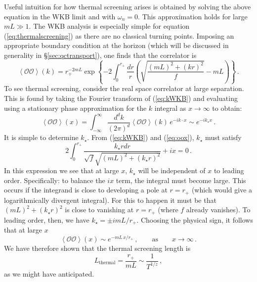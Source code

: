 \documentclass[10pt, oneside]{book}
\def\be{\begin{equation}}
\def\ee{\end{equation}}
\def\ocal{{\mathcal{O}}}
\begin{document}
\begin{doublespace}
Useful intuition for how thermal screening arises is obtained by solving the above equation in the WKB limit and with $\omega_n=0$. This approximation holds for large $m L \gg 1$. The WKB analysis is especially simple for equation (\ref{eq:thermalscreening}) as there are no classical turning points. Imposing an appropriate boundary condition at the horizon (which will be discussed in generality in \S\ref{sec:qctransport}), one finds that the correlator is
\be\label{eq:kWKB}
\left\langle \ocal \ocal \right\rangle(k) = r_+^{-2 m L} \exp\left\{- 2 { \int_0^{r_+}  \frac{dr}{r} \left(\sqrt{\frac{(mL)^2 + (k r)^2}{f}} - m L\right)}\right\} \,.
\ee
To see thermal screening, consider the real space correlator at large separation. This is found by taking the Fourier transform of (\ref{eq:kWKB}) and evaluating using a stationary phase approximation for the $k$ integral as $x \to \infty$ to obtain:
\be\label{eq:oox}
\left\langle \ocal \ocal \right\rangle(x) = \int_{-\infty}^\infty \frac{d^{d}k}{(2\pi)^{d}}  \left\langle \ocal \ocal \right\rangle(k) \, e^{- i k \cdot x} \sim e^{- i k_\star x}\,.
\ee
It is simple to determine $k_\star$. From (\ref{eq:kWKB}) and (\ref{eq:oox}), $k_\star$ must satisfy
\be
2  \int_0^{r_+} \frac{k_\star r dr}{\sqrt{f}\sqrt{(mL)^2 + (k_\star r)^2}} + i x = 0 \,.
\ee
In this expression we see that at large $x$, $k_\star$ will be independent of $x$ to leading order. Specifically: to balance the $i x$ term, the integral must become large. This occurs if the integrand is close to developing a pole at $r = r_+$ (which would give a logarithmically divergent integral). For this to happen it must be that $(mL)^2 + (k_\star r)^2$ is close to vanishing at $r=r_+$ (where $f$ already vanishes). To leading order, then, we have $k_\star = \pm i m L/r_+$. Choosing the physical sign, it follows that at large $x$
\be\label{eq:decayspace}
\left\langle \ocal \ocal \right\rangle(x) \sim e^{- m L \, x/r_+} \,, \qquad \text{as} \qquad x \to \infty \,.
\ee
We have therefore shown that the thermal screening length is
\be\label{eq:screenT}
L_\text{thermal} = \frac{r_+}{m L} \sim \frac{1}{T^{1/z}} \,,
\ee
as we might have anticipated.


\end{doublespace}
\end{document}
